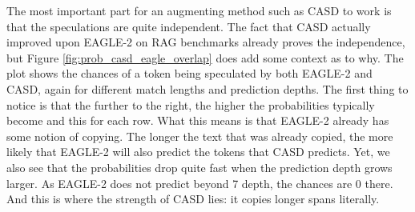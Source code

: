 The most important part for an augmenting method such as CASD to work is that the speculations are quite independent. The fact that CASD actually improved upon EAGLE-2 on RAG benchmarks already proves the independence, but Figure \ref{fig:prob_casd_eagle_overlap} does add some context as to why. The plot shows the chances of a token being speculated by both EAGLE-2 and CASD, again for different match lengths and prediction depths. The first thing to notice is that the further to the right, the higher the probabilities typically become and this for each row. What this means is that EAGLE-2 already has some notion of copying. The longer the text that was already copied, the more likely that EAGLE-2 will also predict the tokens that CASD predicts. Yet, we also see that the probabilities drop quite fast when the prediction depth grows larger. As EAGLE-2 does not predict beyond 7 depth, the chances are 0 there. And this is where the strength of CASD lies: it copies longer spans literally.

